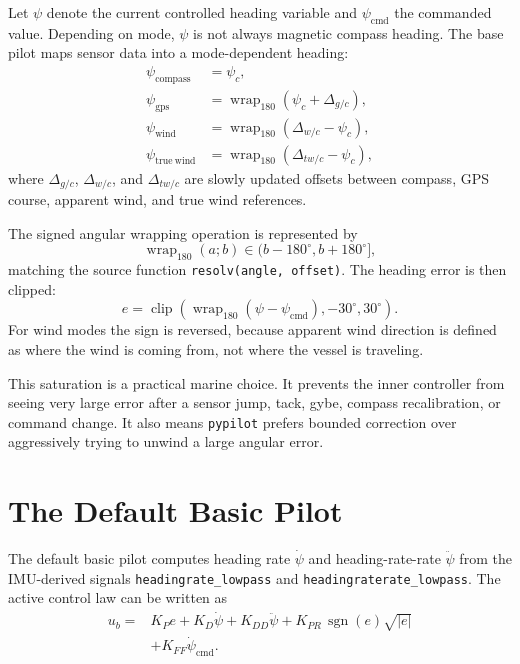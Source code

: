\documentclass[10pt,twocolumn]{article}
\newcommand{\abs}[1]{\left\lvert #1 \right\rvert}
\newcommand{\wrap}{\operatorname{wrap}_{180}}
\newcommand{\sgn}{\operatorname{sgn}}
\newcommand{\clip}{\operatorname{clip}}
\newcommand{\heading}{\psi}
\newcommand{\cmd}{\mathrm{cmd}}
\begin{document}
Let \(\heading\) denote the current controlled heading variable and
\(\heading_{\cmd}\) the commanded value.  Depending on mode, \(\heading\) is not always
magnetic compass heading.  The base pilot maps sensor data into a mode-dependent heading:
\begin{align}
\heading_{\mathrm{compass}} &= \heading_c, \\
\heading_{\mathrm{gps}} &= \wrap(\heading_c + \Delta_{g/c}), \\
\heading_{\mathrm{wind}} &= \wrap(\Delta_{w/c} - \heading_c), \\
\heading_{\mathrm{true\ wind}} &= \wrap(\Delta_{tw/c} - \heading_c),
\end{align}
where \(\Delta_{g/c}\), \(\Delta_{w/c}\), and \(\Delta_{tw/c}\) are slowly updated offsets
between compass, GPS course, apparent wind, and true wind references.

The signed angular wrapping operation is represented by
\begin{equation}
  \wrap(a; b) \in (b-180^{\circ}, b+180^{\circ}],
\end{equation}
matching the source function \texttt{resolv(angle, offset)}.  The heading error is then
clipped:
\begin{equation}
  e = \clip\!\left(\wrap(\heading - \heading_{\cmd}), -30^{\circ}, 30^{\circ}\right).
  \label{eq:error-clip}
\end{equation}
For wind modes the sign is reversed, because apparent wind direction is defined as where
the wind is coming from, not where the vessel is traveling.

This saturation is a practical marine choice.  It prevents the inner controller from
seeing very large error after a sensor jump, tack, gybe, compass recalibration, or command
change.  It also means \texttt{pypilot} prefers bounded correction over aggressively
trying to unwind a large angular error.

\section{The Default Basic Pilot}

The default basic pilot computes heading rate \(\dot{\heading}\) and heading-rate-rate
\(\ddot{\heading}\) from the IMU-derived signals
\texttt{headingrate\_lowpass} and \texttt{headingraterate\_lowpass}.  The active control
law can be written as
\begin{equation}
\begin{split}
  u_b ={}& K_P e
        + K_D \dot{\heading}
        + K_{DD} \ddot{\heading}
        + K_{PR}\,\sgn(e)\sqrt{\abs{e}} \\
        &+ K_{FF}\dot{\heading}_{\cmd} .
\end{split}
\label{eq:basic}
\end{equation}
\end{document}
